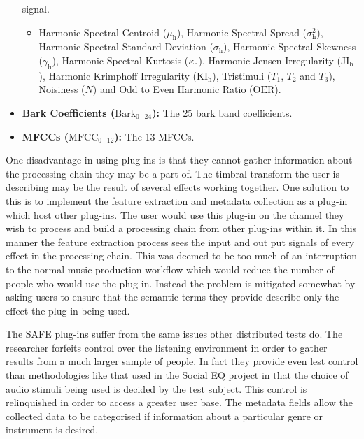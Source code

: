 \begin{itemize}
			      signal.
			\begin{itemize}
				\item Harmonic Spectral Centroid ($\mu_{\mathrm{h}}$), Harmonic Spectral Spread
				      ($\sigma_{\mathrm{h}}^{2}$), Harmonic Spectral Standard Deviation
				      ($\sigma_{\mathrm{h}}$), Harmonic Spectral Skewness ($\gamma_{\mathrm{h}}$), Harmonic
				      Spectral Kurtosis ($\kappa_{\mathrm{h}}$), Harmonic Jensen Irregularity
				      ($\mathrm{JI_{h}}$), Harmonic Krimphoff Irregularity
				      ($\mathrm{KI_{h}}$), Tristimuli ($T_{1}$, $T_{2}$ and $T_{3}$), Noisiness
				      ($N$) and Odd to Even Harmonic Ratio ($\mathrm{OER}$).
			\end{itemize}
			\item {\bf{Bark Coefficients (}}$\mathrm{Bark}_{0\mathrm{-}24}${\bf{):}} The 25 bark band
			      coefficients.
			\item {\bf{MFCCs (}}$\mathrm{MFCC}_{0\mathrm{-}12}${\bf{):}} The 13 MFCCs.
		\end{itemize}

		One disadvantage in using plug-ins is that they cannot gather information about the processing chain they
		may be a part of. The timbral transform the user is describing may be the result of several effects working
		together. One solution to this is to implement the feature extraction and metadata collection as a plug-in
		which host other plug-ins. The user would use this plug-in on the channel they wish to process and build a
		processing chain from other plug-ins within it. In this manner the feature extraction process sees the
		input and out put signals of every effect in the processing chain. This was deemed to be too much of an
		interruption to the normal music production workflow which would reduce the number of people who would use
		the plug-in. Instead the problem is mitigated somewhat by asking users to ensure that the semantic terms
		they provide describe only the effect the plug-in being used.

		The SAFE plug-ins suffer from the same issues other distributed tests do. The researcher forfeits control
		over the listening environment in order to gather results from a much larger sample of people. In fact they
		provide even lest control than methodologies like that used in the Social EQ project
		\citep{cartwright2013socialeq} in that the choice of audio stimuli being used is decided by the test
		subject. This control is relinquished in order to access a greater user base. The metadata fields allow the
		collected data to be categorised if information about a particular genre or instrument is desired.

